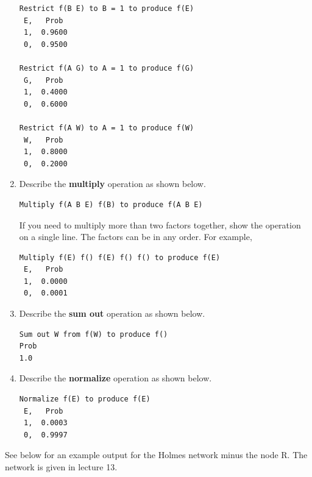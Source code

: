 \documentclass[12pt]{article}
\begin{document}
\begin{enumerate}
\begin{verbatim}
Restrict f(B E) to B = 1 to produce f(E)
 E,   Prob
 1,  0.9600
 0,  0.9500

Restrict f(A G) to A = 1 to produce f(G)
 G,   Prob
 1,  0.4000
 0,  0.6000

Restrict f(A W) to A = 1 to produce f(W)
 W,   Prob
 1,  0.8000
 0,  0.2000

\end{verbatim}

\item
Describe the {\bf multiply} operation as shown below.
%
\begin{verbatim}
Multiply f(A B E) f(B) to produce f(A B E)
\end{verbatim}

If you need to multiply more than two factors together, show the operation on a single line. The factors can be in any order. For example,
%
\begin{verbatim}
Multiply f(E) f() f(E) f() f() to produce f(E)
 E,   Prob
 1,  0.0000
 0,  0.0001
\end{verbatim}

\item
Describe the {\bf sum out} operation as shown below.
%
\begin{verbatim}
Sum out W from f(W) to produce f()
Prob
1.0
\end{verbatim}

\item
Describe the {\bf normalize} operation as shown below.
%
\begin{verbatim}
Normalize f(E) to produce f(E)
 E,   Prob
 1,  0.0003
 0,  0.9997
\end{verbatim}

\end{enumerate}

See below for an example output for the Holmes network minus the node R. The network is given in lecture 13.
\end{document}
